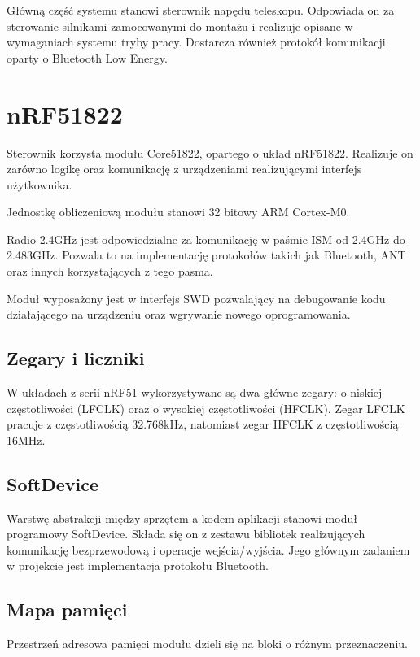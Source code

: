 Główną część systemu stanowi sterownik napędu teleskopu. Odpowiada on za
sterowanie silnikami zamocowanymi do montażu i realizuje opisane w wymaganiach
systemu tryby pracy. Dostarcza również protokół komunikacji oparty o Bluetooth
Low Energy.

\section{nRF51822}

Sterownik korzysta modułu Core51822, opartego o układ nRF51822. Realizuje on
zarówno logikę oraz komunikację z urządzeniami realizującymi interfejs
użytkownika.

Jednostkę obliczeniową modułu stanowi 32 bitowy ARM Cortex-M0.

Radio 2.4GHz jest odpowiedzialne za komunikację w paśmie ISM od 2.4GHz do
2.483GHz.  Pozwala to na implementację protokołów takich jak Bluetooth, ANT oraz
innych korzystających z tego pasma.  

Moduł wyposażony jest w interfejs SWD pozwalający na debugowanie kodu
działającego na urządzeniu oraz wgrywanie nowego oprogramowania.

\subsection{Zegary i liczniki}

W układach z serii nRF51 wykorzystywane są dwa główne zegary: o niskiej
częstotliwości (LFCLK) oraz o wysokiej częstotliwości (HFCLK). Zegar LFCLK
pracuje z częstotliwością 32.768kHz, natomiast zegar HFCLK z częstotliwością
16MHz.

\subsection{SoftDevice}

Warstwę abstrakcji między sprzętem a kodem aplikacji stanowi moduł programowy
SoftDevice. Składa się on z zestawu bibliotek realizujących komunikację
bezprzewodową i operacje wejścia/wyjścia. Jego głównym zadaniem w projekcie jest
implementacja protokołu Bluetooth.

\subsection{Mapa pamięci}

Przestrzeń adresowa pamięci modułu dzieli się na bloki o różnym przeznaczeniu.

